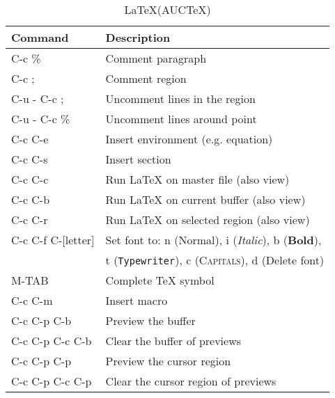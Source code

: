 \documentclass[11pt, a4paper]{article}
\begin{document}
\begin{table}[!ht]
  \caption{\LaTeX (AUCTeX)}
  \begin{center}
    \begin{tabular}{l l}
      \hline
      Command   &       Description \\
      \hline
      C-c \%    &       Comment paragraph \\
      C-c ;     &       Comment region \\
      C-u - C-c ;  &       Uncomment lines in the region \\
      C-u - C-c \% &       Uncomment lines around point \\
      C-c C-e   &       Insert environment (e.g. equation) \\
      C-c C-s   &       Insert section \\
      C-c C-c   &       Run LaTeX on master file (also view) \\
      C-c C-b   &       Run LaTeX on current buffer (also view) \\
      C-c C-r   &       Run LaTeX on selected region (also view) \\
      C-c C-f C-[letter]
                &       Set font to: n (\textnormal{Normal}), i
                        (\textit{Italic}), b (\textbf{Bold}),\\
                &       t (\texttt{Typewriter}), c (\textsc{Capitals}), d (Delete
                        font) \\
      M-TAB     &       Complete TeX symbol \\
      C-c C-m   &       Insert macro \\
      C-c C-p C-b &     Preview the buffer \\
      C-c C-p C-c C-b & Clear the buffer of previews \\
      C-c C-p C-p   &       Preview the cursor region \\
      C-c C-p C-c C-p   & Clear the cursor region of previews \\
      \hline
    \end{tabular}
  \end{center}
\end{table}
\end{document}
